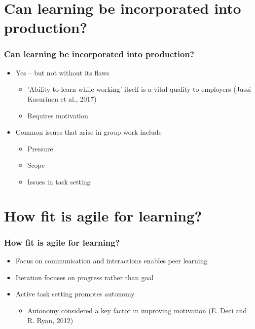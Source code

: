 \documentclass{beamer}
\begin{document}
\section{Can learning be incorporated into production?}
\begin{frame}
	\frametitle{Can learning be incorporated into production?}
	\begin{itemize}
		\item Yes -- but not without its flaws
		\begin{itemize}
			\item 'Ability to learn while working' itself is a vital quality to employers (Jussi Kasurinen et al., 2017)
			\item Requires motivation
		\end{itemize}
	\end{itemize}
	\begin{itemize}
		\item Common issues that arise in group work include
		\begin{itemize}
			\item Pressure
			\item Scope
			\item Issues in task setting
		\end{itemize}
	\end{itemize}
\end{frame}

\section{How fit is agile for learning?}
\begin{frame}
	\frametitle{How fit is agile for learning?}
	\begin{itemize}
		\item Focus on communication and interactions enables peer learning
		\item Iteration focuses on progress rather than goal
		\item Active task setting promotes autonomy
		\begin{itemize}
			\item Autonomy considered a key factor in improving motivation (E. Deci and R. Ryan, 2012)
		\end{itemize}
	\end{itemize}
\end{frame}
\end{document}
